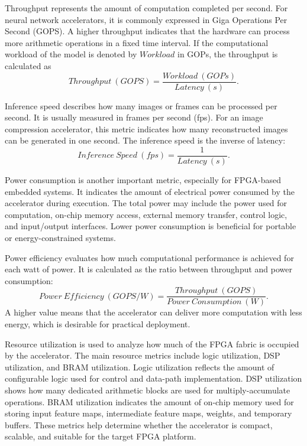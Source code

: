 \documentclass[11pt]{report}
\begin{document}
Throughput represents the amount of computation completed per second. For neural network accelerators, it is commonly expressed in Giga Operations Per Second (GOPS). A higher throughput indicates that the hardware can process more arithmetic operations in a fixed time interval. If the computational workload of the model is denoted by $Workload$ in GOPs, the throughput is calculated as
\begin{equation}
Throughput~(GOPS) = \frac{Workload~(GOPs)}{Latency~(s)}.
\end{equation}

Inference speed describes how many images or frames can be processed per second. It is usually measured in frames per second (fps). For an image compression accelerator, this metric indicates how many reconstructed images can be generated in one second. The inference speed is the inverse of latency:
\begin{equation}
Inference~Speed~(fps) = \frac{1}{Latency~(s)}.
\end{equation}

Power consumption is another important metric, especially for FPGA-based embedded systems. It indicates the amount of electrical power consumed by the accelerator during execution. The total power may include the power used for computation, on-chip memory access, external memory transfer, control logic, and input/output interfaces. Lower power consumption is beneficial for portable or energy-constrained systems.

Power efficiency evaluates how much computational performance is achieved for each watt of power. It is calculated as the ratio between throughput and power consumption:
\begin{equation}
Power~Efficiency~(GOPS/W) = \frac{Throughput~(GOPS)}{Power~Consumption~(W)}.
\end{equation}
A higher value means that the accelerator can deliver more computation with less energy, which is desirable for practical deployment.

Resource utilization is used to analyze how much of the FPGA fabric is occupied by the accelerator. The main resource metrics include logic utilization, DSP utilization, and BRAM utilization. Logic utilization reflects the amount of configurable logic used for control and data-path implementation. DSP utilization shows how many dedicated arithmetic blocks are used for multiply-accumulate operations. BRAM utilization indicates the amount of on-chip memory used for storing input feature maps, intermediate feature maps, weights, and temporary buffers. These metrics help determine whether the accelerator is compact, scalable, and suitable for the target FPGA platform.
\end{document}
